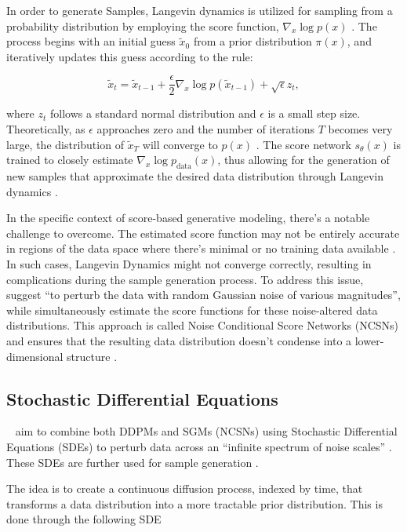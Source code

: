 In order to generate Samples, Langevin dynamics \citep{robertsLangevin} is utilized for sampling from a probability distribution by employing the score function, \( \nabla_x \log p(x) \) \citep{song2019SGM}. The process begins with an initial guess \( \tilde{x}_0 \) from a prior distribution \( \pi(x) \), and iteratively updates this guess according to the rule:

\[ \tilde{x}_t = \tilde{x}_{t-1} + \frac{\epsilon}{2} \nabla_x \log p(\tilde{x}_{t-1}) + \sqrt{\epsilon} z_t, \]

\citep{song2019SGM} where \( z_t \) follows a standard normal distribution and \( \epsilon \) is a small step size. Theoretically, as \( \epsilon \) approaches zero and the number of iterations \( T \) becomes very large, the distribution of \( \tilde{x}_T \) will converge to \( p(x) \) \citep{song2019SGM}. The score network \( s_\theta(x) \) is trained to closely estimate \( \nabla_x \log p_{\text{data}}(x) \), thus allowing for the generation of new samples that approximate the desired data distribution through Langevin dynamics \citep{song2019SGM}.

In the specific context of score-based generative modeling, there's a notable challenge to overcome. The estimated score function may not be entirely accurate in regions of the data space where there's minimal or no training data available \citep{song2019SGM}. In such cases, Langevin Dynamics might not converge correctly, resulting in complications during the sample generation process. To address this issue,~\cite{song2019SGM} suggest ``to perturb the data with random Gaussian noise of various magnitudes'', while simultaneously estimate the score functions for these noise-altered data distributions. This approach is called Noise Conditional Score Networks (NCSNs) and ensures that the resulting data distribution doesn't condense into a lower-dimensional structure \citep{song2019SGM}.

\subsection{Stochastic Differential Equations}

~\cite{song2020score} aim to combine both DDPMs and SGMs (NCSNs) using Stochastic Differential Equations (SDEs) to perturb data across an ``infinite spectrum of noise scales'' \citep{song2020score}. These SDEs are further used for sample generation \citep{yangdiffusionSummary}.

The idea is to create a continuous diffusion process, indexed by time, that transforms a data distribution into a more tractable prior distribution. This is done through the following SDE

